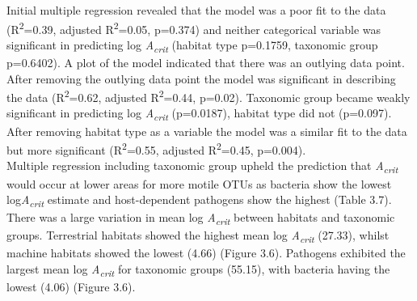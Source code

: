 {{\noindent Initial multiple regression revealed that the model was a poor fit to the data (R\textsuperscript{2}=0.39, adjusted R\textsuperscript{2}=0.05, p=0.374) and neither categorical variable was significant in predicting log \textit{A\textsubscript{crit}} (habitat type p=0.1759, taxonomic group p=0.6402). A plot of the model indicated that there was an outlying data point. After removing the outlying data point the model was significant in describing the data (R\textsuperscript{2}=0.62, adjusted R\textsuperscript{2}=0.44, p=0.02). Taxonomic group became weakly significant in predicting log \textit{A\textsubscript{crit}} (p=0.0187), habitat type did not (p=0.097). After removing habitat type as a variable the model was a similar fit to the data but more significant (R\textsuperscript{2}=0.55, adjusted R\textsuperscript{2}=0.45, p=0.004).\\

\noindent Multiple regression including taxonomic group upheld the prediction that \textit{A\textsubscript{crit}} would occur at lower areas for more motile OTUs as bacteria show the lowest log\textit{A\textsubscript{crit}} estimate and host-dependent pathogens show the highest (Table 3.7). \\

\noindent There was a large variation in mean log \textit{A\textsubscript{crit}} between habitats and taxonomic groups. Terrestrial habitats showed the highest mean log \textit{A\textsubscript{crit}} (27.33), whilst machine habitats showed the lowest (4.66) (Figure 3.6). Pathogens exhibited the largest mean log \textit{A\textsubscript{crit}} for taxonomic groups (55.15), with bacteria having the lowest (4.06) (Figure 3.6). \\

\begin{figure}[htp]


\end{figure}}}
